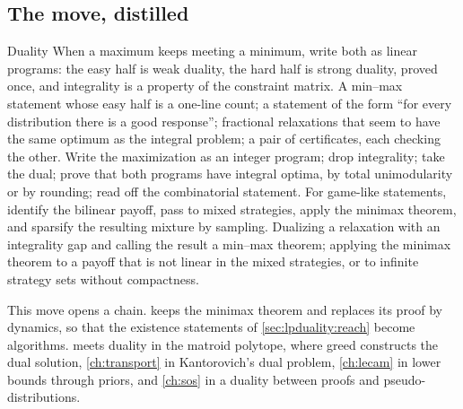 \begin{refsection}
\section{The move, distilled}\label{sec:lpduality:distilled}

\begin{move}{Duality}
 When a maximum keeps meeting a minimum, write both as linear programs: the easy half is weak duality, the hard half is strong duality, proved once, and integrality is a property of the constraint matrix.
 A min--max statement whose easy half is a one-line count; a statement of the form ``for every distribution there is a good response''; fractional relaxations that seem to have the same optimum as the integral problem; a pair of certificates, each checking the other.
 Write the maximization as an integer program; drop integrality; take the dual; prove that both programs have integral optima, by total unimodularity or by rounding; read off the combinatorial statement. For game-like statements, identify the bilinear payoff, pass to mixed strategies, apply the minimax theorem, and sparsify the resulting mixture by sampling.
 Dualizing a relaxation with an integrality gap and calling the result a min--max theorem; applying the minimax theorem to a payoff that is not linear in the mixed strategies, or to infinite strategy sets without compactness.
\end{move}


This move opens a chain.  keeps the minimax theorem and replaces its proof by dynamics, so that the existence statements of \cref{sec:lpduality:reach} become algorithms.  meets duality in the matroid polytope, where greed constructs the dual solution, \cref{ch:transport} in Kantorovich's dual problem, \cref{ch:lecam} in lower bounds through priors, and \cref{ch:sos} in a duality between proofs and pseudo-distributions.


\end{refsection}
